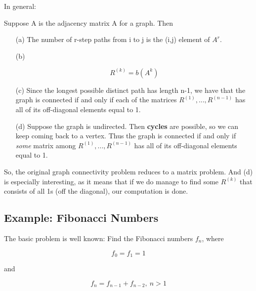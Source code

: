 In general:

\begin{theorem}
Suppose A is the adjacency matrix A for a graph.  Then

\begin{itemize}

\item [(a)] The number of r-step paths from i to j is the (i,j) element of
$A^r$.  

\item [(b)]  

\begin{equation}
R^{(k)} = b(A^k)
\end{equation}

\item [(c)]  Since the longest possible distinct path has length n-1, we
have that the graph is connected if and only if each of the matrices
$R^{(1)},...,R^{(n-1)}$ has all of its off-diagonal elements equal to 1.

\item [(d)] Suppose the graph is undirected.  Then {\bf cycles} are
possible, so we can keep coming back to a vertex.  Thus the graph is
connected if and only if {\it some} matrix among 
$R^{(1)},...,R^{(n-1)}$ has all of its off-diagonal elements equal to 1.

\end{itemize}

\end{theorem}

So, the original graph connectivity problem reduces to a matrix problem.
And (d) is especially interesting, as it means that if we do manage to
find some $R^{(k)}$ that consists of all 1s (off the diagonal), our
computation is done.

\subsection{Example:  Fibonacci Numbers}

The basic problem is well known: Find the Fibonacci numbers $f_n$, where 

\begin{equation}
\label{fibinit}
f_0 = f_1 = 1
\end{equation}

and

\begin{equation}
\label{fib}
f_n = f_{n-1} + f_{n-2}, ~ n > 1
\end{equation}

